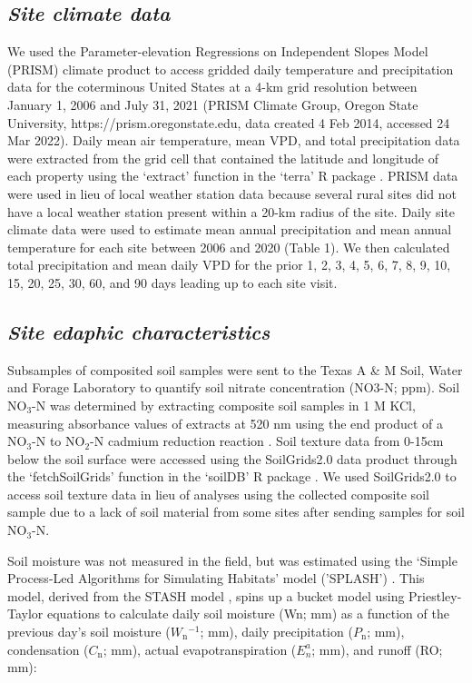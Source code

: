 \subsection{\textit{Site climate data}}
We used the Parameter-elevation Regressions on Independent Slopes Model (PRISM) climate product to access gridded daily temperature and precipitation data for the coterminous United States at a 4-km grid resolution between January 1, 2006 and July 31, 2021 (PRISM Climate Group, Oregon State University, https://prism.oregonstate.edu, data created 4 Feb 2014, accessed 24 Mar 2022). Daily mean air temperature, mean VPD, and total precipitation data were extracted from the grid cell that contained the latitude and longitude of each property using the ‘extract’ function in the ‘terra’ R package . PRISM data were used in lieu of local weather station data because several rural sites did not have a local weather station present within a 20-km radius of the site. Daily site climate data were used to estimate mean annual precipitation and mean annual temperature for each site between 2006 and 2020 (Table 1). We then calculated total precipitation and mean daily VPD for the prior 1, 2, 3, 4, 5, 6, 7, 8, 9, 10, 15, 20, 25, 30, 60, and 90 days leading up to each site visit.

\subsection{\textit{Site edaphic characteristics}}
Subsamples of composited soil samples were sent to the Texas A \& M Soil, Water and Forage Laboratory to quantify soil nitrate concentration (NO3-N; ppm). Soil NO$_{3}$-N was determined by extracting composite soil samples in 1 M KCl, measuring absorbance values of extracts at 520 nm using the end product of a NO$_{3}$-N to NO$_{2}$-N cadmium reduction reaction . Soil texture data from 0-15cm below the soil surface were accessed using the SoilGrids2.0 data product  through the ‘fetchSoilGrids’ function in the ‘soilDB’ R package . We used SoilGrids2.0 to access soil texture data in lieu of analyses using the collected composite soil sample due to a lack of soil material from some sites after sending samples for soil NO$_{3}$-N.

Soil moisture was not measured in the field, but was estimated using the ‘Simple Process-Led Algorithms for Simulating Habitats’ model ('SPLASH') . This model, derived from the STASH model , spins up a bucket model using Priestley-Taylor equations  to calculate daily soil moisture (Wn; mm) as a function of the previous day’s soil moisture ($W_\mathrm{n}{}^{-1}$; mm), daily precipitation ($P_\mathrm{n}$; mm), condensation ($C_\mathrm{n}$; mm), actual evapotranspiration ($E_{n}^a$; mm), and runoff (RO; mm):

